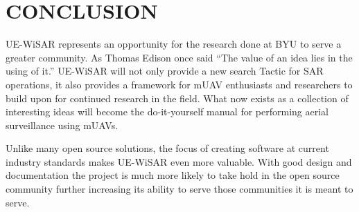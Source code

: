 \documentclass[12pt]{IEEEtran}
\begin{document}
\section{CONCLUSION}
UE-WiSAR represents an opportunity for the research done at BYU to serve a
greater community.  As Thomas Edison once said ``The value of an idea lies in
the using of it.''  UE-WiSAR will not only provide a new search Tactic for
SAR operations, it also provides a framework for mUAV enthusiasts and
researchers to build upon for continued research in the field.  What now exists
as a collection of interesting ideas will become the do-it-yourself manual for
performing aerial surveillance using mUAVs.  

Unlike many open source solutions, the focus of creating software at current
industry standards makes UE-WiSAR even more valuable.  With good design and
documentation the project is much more likely to take hold in the open source
community further increasing its ability to serve those communities it is meant
to serve.


% 

\newpage

\nocite{*}

\end{document}
